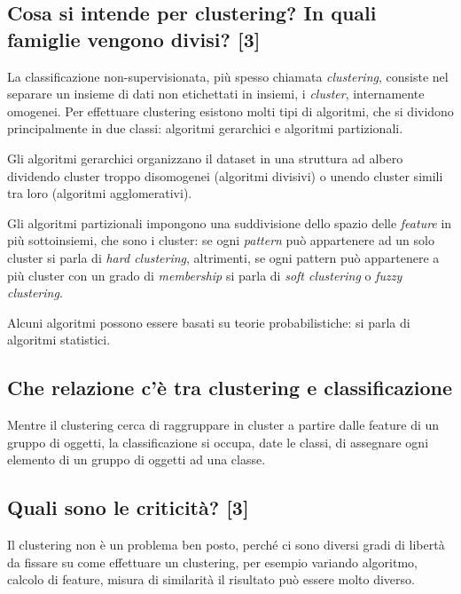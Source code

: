\documentclass[\main/main.tex]{subfiles}
\begin{document}
\subsection{Cosa si intende per clustering? In quali famiglie vengono divisi? [3]}
La classificazione non-supervisionata, più spesso chiamata \textit{clustering}, consiste nel separare un insieme di dati non etichettati in insiemi, i \textit{cluster}, internamente omogenei.
Per effettuare clustering esistono molti tipi di algoritmi, che si dividono principalmente in due classi: algoritmi gerarchici e algoritmi partizionali.

Gli algoritmi gerarchici organizzano il dataset in una struttura ad albero dividendo cluster troppo disomogenei (algoritmi divisivi) o unendo cluster simili tra loro (algoritmi agglomerativi).

Gli algoritmi partizionali impongono una suddivisione dello spazio delle \textit{feature} in più sottoinsiemi, che sono i cluster: se ogni \textit{pattern} può appartenere ad un solo cluster si parla di \textit{hard clustering}, altrimenti, se ogni pattern può appartenere a più cluster con un grado di \textit{membership} si parla di \textit{soft clustering} o \textit{fuzzy clustering}.

Alcuni algoritmi possono essere basati su teorie probabilistiche: si parla di algoritmi statistici.

\subsection{Che relazione c'è tra clustering e classificazione}
Mentre il clustering cerca di raggruppare in cluster a partire dalle feature di un gruppo di oggetti, la classificazione si occupa, date le classi, di assegnare ogni elemento di un gruppo di oggetti ad una classe.

\subsection{Quali sono le criticità? [3]}
Il clustering non è un problema ben posto, perché ci sono diversi gradi di libertà da fissare su come effettuare un clustering, per esempio variando algoritmo, calcolo di feature, misura di similarità il risultato può essere molto diverso. 
\end{document}
